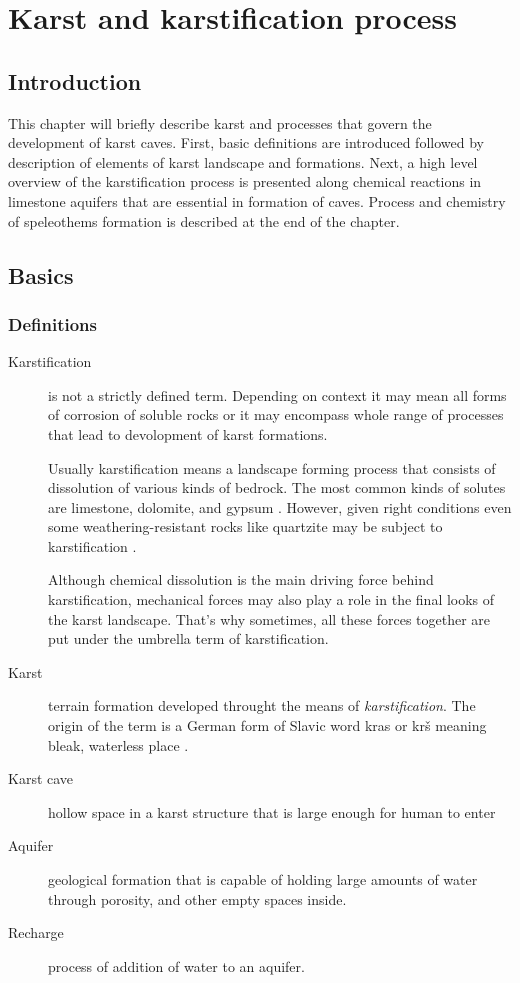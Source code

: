 \chapter{Karst and karstification process}
\label{chap:karstification}
\section{Introduction}
This chapter will briefly describe karst and processes that govern the
development of karst caves. First, basic definitions are introduced followed by
description of elements of karst landscape and formations. Next, a high level
overview of the karstification process is presented along chemical reactions
in limestone aquifers that are essential in formation of caves. Process and
chemistry of speleothems formation is described at the end of the chapter.
\section{Basics}

\subsection{Definitions}
\begin{description}
  \item[Karstification]
    is not a strictly defined term. Depending on context it may
    mean all forms of corrosion of soluble rocks or it may encompass whole range of
    processes that lead to devolopment of karst formations.
    
    Usually karstification means a landscape forming process that consists of
    dissolution of various kinds of bedrock. The most common kinds of solutes
    are limestone, dolomite, and gypsum \parencite{karstglossary}. However,
    given right conditions even some weathering-resistant rocks like quartzite
    may be subject to karstification \parencite{migon2010}.
    
    Although chemical dissolution is the main driving force behind karstification,
    mechanical forces may also play a role in the final looks of the karst landscape.
    That's why sometimes, all these forces together are put under the umbrella term
    of karstification.

  \item[Karst]
    terrain formation developed throught the means of
    \emph{karstification}. The origin of the term is a German form of Slavic word
    kras or krš meaning bleak, waterless place \parencite{karstglossary}.
  \item[Karst cave]
    hollow space in a karst structure that is large enough for human to enter
    \parencite{hill1997cave}
  \item[Aquifer]
    geological formation that is capable of holding large amounts of water
    through porosity, and other empty spaces inside.
  \item[Recharge]
    process of addition of water to an aquifer.
\end{description}
